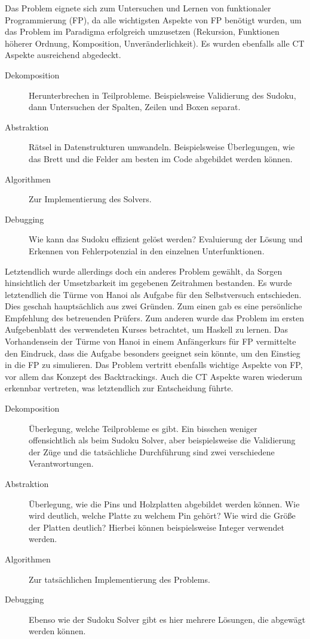 Das Problem eignete sich zum Untersuchen und Lernen von funktionaler Programmierung (FP), da alle wichtigsten Aspekte von FP benötigt wurden, um das Problem im Paradigma erfolgreich umzusetzen (Rekursion, Funktionen höherer Ordnung, Komposition, Unveränderlichkeit). Es wurden ebenfalls alle CT Aspekte ausreichend abgedeckt.

\begin{description}
    \item[Dekomposition] Herunterbrechen in Teilprobleme. Beispielsweise Validierung des Sudoku, dann Untersuchen der Spalten, Zeilen und Boxen separat.
    \item[Abstraktion] Rätsel in Datenstrukturen umwandeln. Beispielsweise Überlegungen, wie das Brett und die Felder am besten im Code abgebildet werden können.
    \item[Algorithmen] Zur Implementierung des Solvers.
    \item[Debugging] Wie kann das Sudoku effizient gelöst werden? Evaluierung der Lösung und Erkennen von Fehlerpotenzial in den einzelnen Unterfunktionen.
\end{description}

Letztendlich wurde allerdings doch ein anderes Problem gewählt, da Sorgen hinsichtlich der Umsetzbarkeit im gegebenen Zeitrahmen bestanden.
Es wurde letztendlich die Türme von Hanoi als Aufgabe für den Selbstversuch entschieden. Dies geschah hauptsächlich aus zwei Gründen. Zum einen gab es eine persönliche Empfehlung des betreuenden Prüfers. Zum anderen wurde das Problem im ersten Aufgebenblatt des verwendeten Kurses betrachtet, um Haskell zu lernen. Das Vorhandensein der Türme von Hanoi in einem Anfängerkurs für FP vermittelte den Eindruck, dass die Aufgabe besonders geeignet sein könnte, um den Einstieg in die FP zu simulieren.
Das Problem vertritt ebenfalls wichtige Aspekte von FP, vor allem das Konzept des Backtrackings. Auch die CT Aspekte waren wiederum erkennbar vertreten, was letztendlich zur Entscheidung führte.

\begin{description}
    \item[Dekomposition] Überlegung, welche Teilprobleme es gibt. Ein bisschen weniger offensichtlich als beim Sudoku Solver, aber beispielsweise die Validierung der Züge und die tatsächliche Durchführung sind zwei verschiedene Verantwortungen.
    \item[Abstraktion] Überlegung, wie die Pins und Holzplatten abgebildet werden können. Wie wird deutlich, welche Platte zu welchem Pin gehört? Wie wird die Größe der Platten deutlich? Hierbei können beispielsweise Integer verwendet werden.
    \item[Algorithmen] Zur tatsächlichen Implementierung des Problems.
    \item[Debugging] Ebenso wie der Sudoku Solver gibt es hier mehrere Lösungen, die abgewägt werden können.
\end{description}

